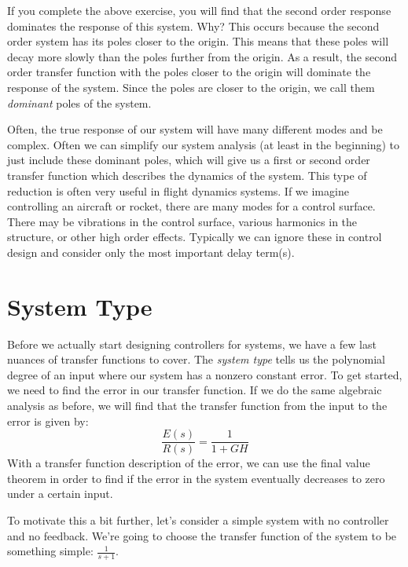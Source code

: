 If you complete the above exercise, you will find that the second order response dominates the response of this system. Why? This occurs because the second order system has its poles closer to the origin. This means that these poles will decay more slowly than the poles further from the origin. As a result, the second order transfer function with the poles closer to the origin will dominate the response of the system. Since the poles are closer to the origin, we call them \textit{dominant} poles of the system.

Often, the true response of our system will have many different modes and be complex. Often we can simplify our system analysis (at least in the beginning) to just include these dominant poles, which will give us a first or second order transfer function which describes the dynamics of the system. This type of reduction is often very useful in flight dynamics systems. If we imagine controlling an aircraft or rocket, there are many modes for a control surface. There may be vibrations in the control surface, various harmonics in the structure, or other high order effects. Typically we can ignore these in control design and consider only the most important delay term(s).

\section{System Type}
Before we actually start designing controllers for systems, we have a few last nuances of transfer functions to cover. The \textit{system type} tells us the polynomial degree of an input where our system has a nonzero constant error. To get started, we need to find the error in our transfer function. If we do the same algebraic analysis as before, we will find that the transfer function from the input to the error is given by:
$$\frac{E(s)}{R(s)}=\frac{1}{1+GH}$$
With a transfer function description of the error, we can use the final value theorem in order to find if the error in the system eventually decreases to zero under a certain input.

To motivate this a bit further, let's consider a simple system with no controller and no feedback. We're going to choose the transfer function of the system to be something simple: $\frac{1}{s+1}$.

